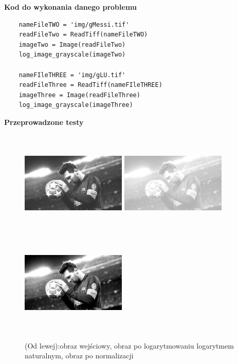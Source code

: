 \documentclass[magisterska,openany]{pracadypl}
\begin{document}
\vspace{0.5cm}
\textbf{\Large Kod do wykonania danego problemu}
\lstset{language=Python}
\vspace{0.25cm}
\begin{lstlisting}
	nameFileTWO = 'img/gMessi.tif'
	readFileTwo = ReadTiff(nameFileTWO)
	imageTwo = Image(readFileTwo)
	log_image_grayscale(imageTwo)
	
	nameFIleTHREE = 'img/gLU.tif'
	readFileThree = ReadTiff(nameFIleTHREE)
	imageThree = Image(readFileThree)
	log_image_grayscale(imageThree)

\end{lstlisting}
\newpage

\vspace{0.25cm}\textbf{\Large Przeprowadzone testy}
\vspace{0.5cm}
\begin{figure}[h]
\centering
\includegraphics[width=5cm, height=5cm]{orgi/gMessi.jpg}
\includegraphics[width=5cm, height=5cm]{3_10/logG1.jpg}
\includegraphics[width=5cm, height=5cm]{3_10/nlogG1.jpg}
\caption{(Od lewej):obraz wejściowy, obraz po logarytmowaniu logarytmem
naturalnym, obraz po normalizacji}
\end{figure}
\end{document}
